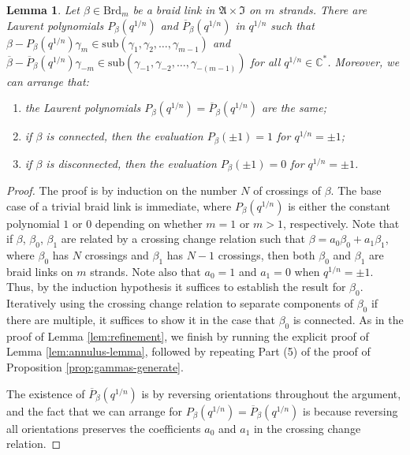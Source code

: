\documentclass[12pt,
	]{amsart}
\newtheorem{lemma}[theorem]{Lemma}
\theoremstyle{definition}
\renewcommand{\bar}{\overline}
\newcommand{\mrm}[1]{\mathrm{#1}}
\newcommand{\mbb}[1]{\mathbb{#1}}
\newcommand{\mfrak}[1]{\mathfrak{#1}}
\newcommand{\lp}{\left(}\newcommand{\rp}{\right)}
\newcommand{\sub}[1]{\mrm{sub}\lp#1\rp}
\newcommand{\rev}[1]{\bar{#1}}
\newcommand{\C}{\mbb{C}}
\newcommand{\sC}{\C^\ast}
\newcommand{\ann}{\mfrak{A}}
\newcommand{\intt}{\mfrak{I}}
\newcommand{\qroot}{q^{1/n}}
\newcommand{\braid}{\mrm{Brd}}
\begin{document}
\begin{lemma}\label{lem:leading-skein-term}
Let $\beta\in\braid_m$ be a braid link in $\ann\times\intt$ on $m$ strands.  There are Laurent polynomials $P_\beta(\qroot)$ and $\rev{P}_\beta(\qroot)$ in $\qroot$ such that $\beta-P_\beta(\qroot)\gamma_m\in\sub{\gamma_1,\gamma_2,\dots,\gamma_{m-1}}$ and $\rev{\beta}-\rev{P}_\beta(\qroot)\gamma_{-m}\in\sub{\gamma_{-1},\gamma_{-2},\dots,\gamma_{-(m-1)}}$ for all $\qroot\in\sC$.  Moreover, we can arrange that:  
\begin{enumerate}
\item  the Laurent polynomials $P_\beta(\qroot)=\rev{P}_\beta(\qroot)$ are the same;  
\item  if $\beta$ is connected, then the evaluation $P_\beta(\pm1)=1$ for $\qroot=\pm1$; 
\item  if $\beta$ is disconnected, then the evaluation $P_\beta(\pm1)=0$ for $\qroot=\pm1$.  
\end{enumerate}
\end{lemma}

\begin{proof}
The proof is by induction on the number $N$ of crossings of $\beta$.  The base case of a trivial braid link is immediate, where $P_\beta(\qroot)$ is either the constant polynomial $1$ or $0$ depending on whether $m=1$ or $m>1$, respectively.  Note that if $\beta$, $\beta_0$, $\beta_1$ are related by a crossing change relation such that $\beta=a_0\beta_0+a_1\beta_1$, where $\beta_0$ has $N$ crossings and $\beta_1$ has $N-1$ crossings, then both $\beta_0$ and $\beta_1$ are braid links on $m$ strands.  Note also that $a_0=1$ and $a_1=0$ when $\qroot=\pm1$. Thus, by the induction hypothesis it suffices to establish the result for $\beta_0$.  Iteratively using the crossing change relation to separate components of $\beta_0$ if there are multiple, it suffices to show it in the case that $\beta_0$ is connected.  As in the proof of Lemma \ref{lem:refinement}, we finish by running the explicit proof of Lemma \ref{lem:annulus-lemma}, followed by repeating Part (5) of the proof of Proposition \ref{prop:gammas-generate}.  

The existence of $\rev{P}_\beta(\qroot)$ is by reversing orientations throughout the argument, and the fact that we can arrange for $P_\beta(\qroot)=\rev{P}_\beta(\qroot)$ is because reversing all orientations preserves the coefficients $a_0$ and $a_1$ in the crossing change relation.  
\end{proof}
\end{document}
